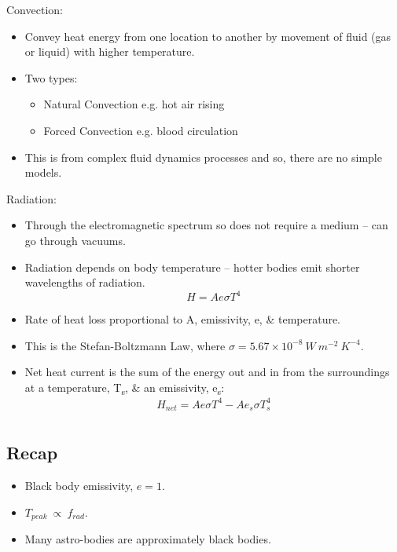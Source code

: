 \documentclass[a4paper, 11pt, normalem]{report}
\begin{document}
Convection:
\begin{itemize}
    \item Convey heat energy from one location to another by movement of fluid (gas or liquid) with higher temperature.
    \item Two types:
        \begin{itemize}
        	\item Natural Convection e.g. hot air rising
        	\item Forced Convection e.g. blood circulation
        \end{itemize}
    \item This is from complex fluid dynamics processes and so, there are no simple models.
\end{itemize}

Radiation:
\begin{itemize}
    \item Through the electromagnetic spectrum so does not require a medium -- can go through vacuums.
    \item Radiation depends on body temperature -- hotter bodies emit shorter wavelengths of radiation.
        \begin{equation}
        	H = Ae{\sigma}T^{4}
        \end{equation}
    \item Rate of heat loss proportional to A, emissivity, e, \& temperature.
    \item This is the Stefan-Boltzmann Law, where $\sigma = 5.67\times10^{-8}~W~m^{-2}~K^{-4}$.
    \item Net heat current is the sum of the energy out and in from the surroundings at a temperature, T\textsubscript{s}, \& an emissivity, e\textsubscript{s}:
        \begin{equation}
        	H_{net} = Ae{\sigma}T^{4} - Ae_{s}{\sigma}T^{4}_{s}
        \end{equation}
\end{itemize}

\chapter{}
\section{Recap}
\begin{itemize}
    \item Black body emissivity, $e = 1$.
    \item $T_{peak} ~\propto~f_{rad}$.
    \item Many astro-bodies are approximately black bodies.
\end{itemize}
\end{document}
